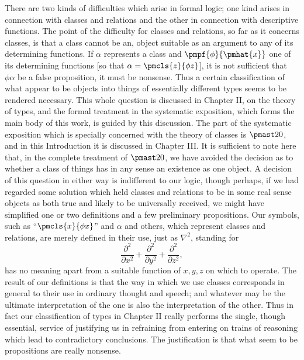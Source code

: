 \documentclass[letterpaper,12pt,openany,leqno]{book}
\newcommand{\pagefirst}[1]{\marginnote[\boxed{\text{#1}}]{\boxed{\text{#1}}}}
\begin{document}
There are two kinds of difficulties which arise in formal logic; one kind arises in connection with classes and relations and the other in connection with descriptive functions. The point of the difficulty for classes and relations, so far as it concerns classes, is that a class cannot be an, object suitable as an argument to any of its determining functions. If $\alpha$ represents \pagefirst{25} a class and $\pmpf{\phi}{\pmhat{x}}$ one of its determining functions [so that $\alpha=\pmcls{z}{\phi z}$], it is not sufficient that $\phi \alpha$ be a false proposition, it must be nonsense. Thus a certain classification of what appear to be objects into things of essentially different types seems to be rendered necessary. This whole question is discussed in Chapter II, on the theory of types, and the formal treatment in the systematic exposition, which forms the main body of this work, is guided by this discussion. The part of the systematic exposition which is specially concerned with the theory of classes is $\pmast20$, and in this Introduction it is discussed in Chapter III. It is sufficient to note here that, in the complete treatment of $\pmast20$, we have avoided the decision as to whether a class of things has in any sense an existence as one object. A decision of this question in either way is indifferent to our logic, though perhaps, if we had regarded some solution which held classes and relations to be in some real sense objects as both true and likely to be universally received, we might have simplified one or two definitions and a few preliminary propositions. Our symbols, such as ``$\pmcls{x}{\phi x}$'' and $\alpha$ and others, which represent classes and relations, are merely defined in their use, just as $\nabla^2$, standing for
\[
	\frac{\partial^2}{\partial x^2} + \frac{\partial^2}{\partial y^2} + \frac{\partial^2}{\partial z^2},
\]
has no meaning apart from a suitable function of $x, y, z$ on which to operate. The result of our definitions is that the way in which we use classes corresponds in general to their use in ordinary thought and speech; and whatever may be the ultimate interpretation of the one is also the interpretation of  the other. Thus in fact our classification of types in Chapter II really performs the single, though essential, service of justifying us in refraining from entering on trains of reasoning which lead to contradictory conclusions. The justification is that what seem to be propositions are really nonsense.
\end{document}

